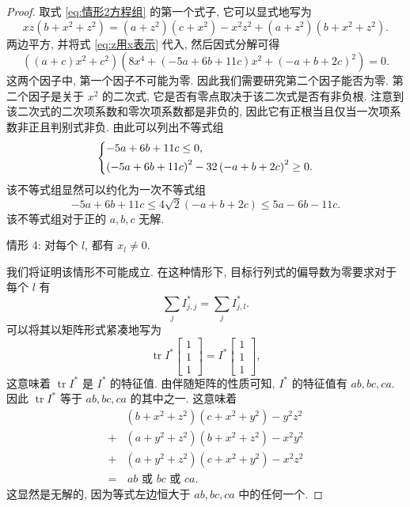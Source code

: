 \documentclass{article}
\begin{document}
\begin{proof}
取式 \ref{eq:情形2方程组} 的第一个式子, 它可以显式地写为
\begin{equation}
	xz\left(b+x^2+z^2\right)=\left(a+z^2\right)\left(c+x^2\right)
	-x^2z^2+\left(a+z^2\right)\left(b+x^2+z^2\right).
\end{equation}
两边平方, 并将式 \ref{eq:z用x表示} 代入, 然后因式分解可得
\begin{equation}
	\left(\left(a+c\right)x^2+c^2\right)
	\left(8x^4+\left(-5a+6b+11c\right)x^2+\left(-a+b+2c\right)^2\right)=0.
\end{equation}
这两个因子中, 第一个因子不可能为零.
因此我们需要研究第二个因子能否为零.
第二个因子是关于 $x^2$ 的二次式, 它是否有零点取决于该二次式是否有非负根.
注意到该二次式的二次项系数和零次项系数都是非负的,
因此它有正根当且仅当一次项系数非正且判别式非负.
由此可以列出不等式组
\begin{equation}
	\begin{dcases}
		-5a+6b+11c\le0,\\
		\left(-5a+6b+11c\right)^2-32\left(-a+b+2c\right)^2\ge0.
	\end{dcases}
\end{equation}
该不等式组显然可以约化为一次不等式组
\begin{equation}
	-5a+6b+11c\le4\sqrt2\left(-a+b+2c\right)\le5a-6b-11c.
\end{equation}
该不等式组对于正的 $a,b,c$ 无解.

情形 4: 对每个 $l$, 都有 $x_l\ne0$.

我们将证明该情形不可能成立.
在这种情形下, 目标行列式的偏导数为零要求对于每个 $l$ 有
\begin{equation}
	\sum_jI^*_{j,j}=\sum_jI^*_{j,l}.
\end{equation}
可以将其以矩阵形式紧凑地写为
\begin{equation}
	\operatorname{tr}I^*\left[\begin{matrix}1\\1\\1\end{matrix}\right]=
	I^*\left[\begin{matrix}1\\1\\1\end{matrix}\right],
\end{equation}
这意味着 $\operatorname{tr}I^*$ 是 $I^*$ 的特征值.
由伴随矩阵的性质可知, $I^*$ 的特征值有 $ab,bc,ca$.
因此 $\operatorname{tr}I^*$ 等于 $ab,bc,ca$ 的其中之一.
这意味着
\begin{equation}
\begin{split}
	&\left(b+x^2+z^2\right)\left(c+x^2+y^2\right)-y^2z^2\\
	+&\left(a+y^2+z^2\right)\left(b+x^2+z^2\right)-x^2y^2\\
	+&\left(a+y^2+z^2\right)\left(c+x^2+y^2\right)-x^2z^2\\
	=&\,\text{$ab$ 或 $bc$ 或 $ca$}.
\end{split}
\end{equation}
这显然是无解的, 因为等式左边恒大于 $ab,bc,ca$ 中的任何一个.


\end{proof}
\end{document}
